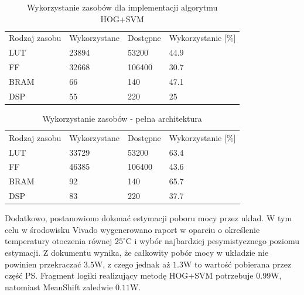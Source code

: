 \begin{table}[ht]
	\centering
	\caption{Wykorzystanie zasobów dla implementacji algorytmu HOG+SVM}
	\captionsetup{justification=centering,margin=1cm}
	\begin{tabular}{|P{3cm} |P{3cm} |P{3cm}|P{4cm}|}	
		\hline
		 Rodzaj zasobu & Wykorzystane & Dostępne & Wykorzystanie [\%]\\ 
		LUT		& 23894	& 53200 & 44.9\\ 
		\hline
		FF		& 32668	& 106400 & 30.7\\ 
		\hline
		BRAM	& 66	& 140 & 47.1\\ 
		\hline
		DSP		& 55	& 220 & 25\\ 
		\hline		
	\end{tabular}
	\label{tab:utilizationHOG}
\end{table}

\begin{table}[ht]
	\centering
	\caption{Wykorzystanie zasobów - pełna architektura}	
	\captionsetup{justification=centering,margin=1cm}
	\begin{tabular}{|P{3cm} |P{3cm} |P{3cm}|P{4cm}|}	
		\hline
		 Rodzaj zasobu & Wykorzystane & Dostępne & Wykorzystanie [\%]\\ 
		LUT		& 33729	& 53200 & 63.4\\ 
		\hline
		FF		& 46385	& 106400 & 43.6\\ 
		\hline
		BRAM	& 92	& 140 & 65.7\\ 
		\hline
		DSP		& 83	& 220 & 37.7\\ 
		\hline		
	\end{tabular}
	\label{tab:utilizationOverall}
\end{table} 

Dodatkowo, postanowiono dokonać estymacji poboru mocy przez układ. W tym celu w środowisku Vivado wygenerowano raport w oparciu o określenie temperatury otoczenia równej $25^{\circ}$C i wybór najbardziej pesymistycznego poziomu estymacji. Z dokumentu wynika, że całkowity pobór mocy w układzie nie powinien przekraczać $3.5$W, z czego jednak aż $1.3$W to wartość pobierana przez część PS. Fragment logiki realizujący metodę HOG+SVM potrzebuje $0.99$W, natomiast MeanShift zaledwie $0.11$W.